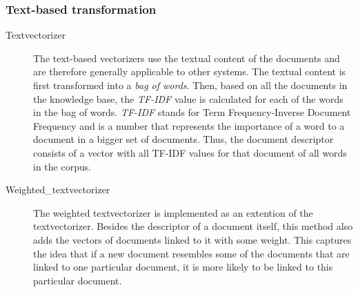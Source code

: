 \subsubsection{Text-based transformation}
\begin{description}
\item [Textvectorizer] The text-based vectorizers use the textual content of the documents and are therefore generally applicable to other systems. The textual content is first transformed into a \emph{bag of words}. Then, based on all the documents in the knowledge base, the \emph{TF-IDF} value is calculated for each of the words in the bag of words. \emph{TF-IDF} stands for Term Frequency-Inverse Document Frequency and is a number that represents the importance of a word to a document in a bigger set of documents. Thus, the document descriptor consists of a vector with all TF-IDF values for that document of all words in the corpus. 

\item[Weighted\_textvectorizer] The weighted textvectorizer is implemented as an extention of the textvectorizer. Besides the descriptor of a document itself, this method also adds the vectors of documents linked to it with some weight. This captures the idea that if a new document resembles some of the documents that are linked to one particular document, it is more likely to be linked to this particular document. 
\end{description}

